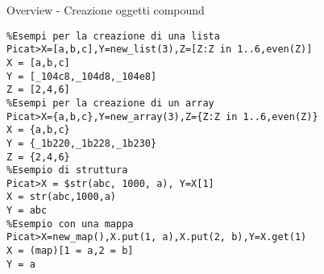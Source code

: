 \iffalse
Qui possiamo vedere un po' di esempi per la creazione di array, liste, strutture e mappe
Liste e array possono essere creati elencando gli elementi, con new_list e new_array oppure con list e array comprehension
Per creare le strutture invece è necessario anteporre il dollaro prima del nome della struttura per far capire al sistema che non si tratta di una chiamata di funzione
le mappe si creano con la funzione new_map e poi è possibile inserire gli elementi con la funzione put e ricavarli invece con la funzione get. Nel caso venga richiesto il get da una mappa senza che tale chiave sia presente allora viene lanciata una eccezione, per evitarlo è possibile aggiungere un valore di default quando si fa la chiamata
\fi

\begin{frame}[fragile, shrink=1]{Overview - Creazione oggetti compound}
	
	\begin{lstlisting}
%Esempi per la creazione di una lista
Picat>X=[a,b,c],Y=new_list(3),Z=[Z:Z in 1..6,even(Z)]
X = [a,b,c]
Y = [_104c8,_104d8,_104e8]
Z = [2,4,6]
%Esempi per la creazione di un array
Picat>X={a,b,c},Y=new_array(3),Z={Z:Z in 1..6,even(Z)}
X = {a,b,c}
Y = {_1b220,_1b228,_1b230}
Z = {2,4,6}
%Esempio di struttura
Picat>X = $str(abc, 1000, a), Y=X[1]
X = str(abc,1000,a)
Y = abc
%Esempio con una mappa
Picat>X=new_map(),X.put(1, a),X.put(2, b),Y=X.get(1)
X = (map)[1 = a,2 = b]
Y = a
	\end{lstlisting}

\end{frame}